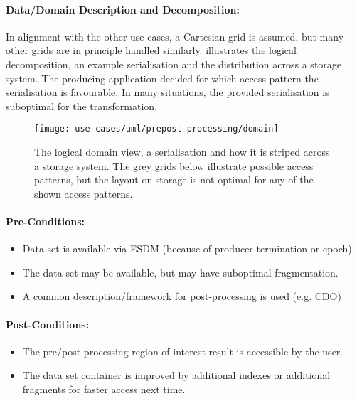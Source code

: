\paragraph{Data/Domain Description and Decomposition:}
In alignment with the other use cases, a Cartesian grid is assumed, but many other grids are in principle handled similarly.
 illustrates the logical decomposition, an example serialisation and the distribution across a storage system.
The producing application decided for which access pattern the serialisation is favourable. In many situations, the provided serialisation is suboptimal for the transformation.


\begin{figure}
	\centering
	\texttt{[image: use-cases/uml/prepost-processing/domain]}
	\caption{The logical domain view, a serialisation and how it is striped across a storage system. The grey grids below illustrate possible access patterns, but the layout on storage is not optimal for any of the shown access patterns. }
	\label{fig:domain pre + post processing}
\end{figure}


\paragraph{Pre-Conditions:}
\begin{itemize}
	\item Data set is available via ESDM (because of producer termination or epoch)
	\item The data set may be available, but may have suboptimal fragmentation.
	\item A common description/framework for post-processing is used (e.g. CDO)
\end{itemize}

\paragraph{Post-Conditions:}
\begin{itemize}
	\item The pre/post processing region of interest result is accessible by the user.
	\item The data set container is improved by additional indexes or additional fragments for faster access next time.
\end{itemize}

